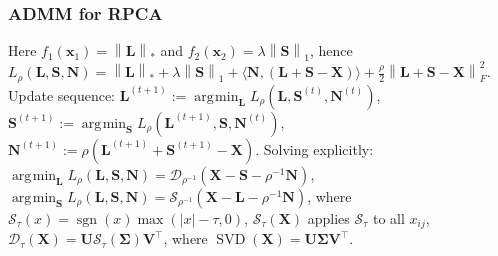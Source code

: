 \documentclass[11pt,a4paper,technote]{IEEEtran}
\DeclareMathOperator*{\argmin}{\arg\!\min}
\newcommand{\abs}[1]{\left\lvert#1\right\rvert}
\newcommand{\norm}[1]{\left\lVert#1\right\rVert}
\newcommand{\inner}[2]{\langle#1,#2\rangle}
\newcommand{\matr}[1]{\boldsymbol{\mathbf{#1}}}
\newcommand{\vect}[1]{\boldsymbol{\mathbf{#1}}}
\newcommand{\trns}[1]{#1^{\top}}
\DeclareMathOperator{\sgn}{sgn}
\DeclareMathOperator{\SVD}{SVD}
\begin{document}
\subsubsection*{ADMM for RPCA}
Here $f_1(\vect{x}_1) = \norm{\matr{L}}_*$ and $f_2(\vect{x}_2) = \lambda
\norm{\matr{S}}_1$, hence $L_{\rho}(\matr{L},\matr{S},\matr{N}) =
\norm{\matr{L}}_* + \lambda\norm{\matr{S}}_1 + \inner{\matr{N}}{(\matr{L} +
  \matr{S} - \matr{X})} + \frac{\rho}{2}\norm{\matr{L} + \matr{S} -
  \matr{X}}_F^2$. Update sequence:
$\matr{L}^{(t+1)}:=\argmin_{\matr{L}}L_{\rho}(\matr{L},\matr{S}^{(t)},\matr{N}^{(t)})$,
$\matr{S}^{(t+1)}:=\argmin_{\matr{S}}L_{\rho}(\matr{L}^{(t+1)},\matr{S},\matr{N}^{(t)})$,
$\matr{N}^{(t+1)}:=\rho(\matr{L}^{(t+1)} + \matr{S}^{(t+1)} - \matr{X})$.
Solving explicitly:
$\argmin_{\matr{L}}L_{\rho}(\matr{L},\matr{S},\matr{N}) = \mathcal{D}_{\rho^{-1}}
(\matr{X} - \matr{S} - \rho^{-1}\matr{N})$,
$\argmin_{\matr{S}}L_{\rho}(\matr{L},\matr{S},\matr{N}) = \mathcal{S}_{\rho^{-1}}
(\matr{X} - \matr{L} - \rho^{-1}\matr{N})$, where $\mathcal{S}_{\tau}(x) =
\sgn(x)\max(\abs{x}-\tau, 0)$, $\mathcal{S}_{\tau}(\matr{X})$ applies
$\mathcal{S}_{\tau}$ to all $x_{ij}$, $\mathcal{D}_{\tau}(\matr{X}) = \matr{U}
\mathcal{S}_{\tau}(\matr{\Sigma})\trns{\matr{V}}$, where $\SVD(\matr{X}) =
\matr{U}\matr{\Sigma}\trns{\matr{V}}$.


\end{document}
